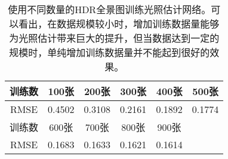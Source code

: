 \begin{table}[htbp]
    \centering
    \caption[数据规模对光照估计的影响]{
        \label{table:eval-data-size}
        使用不同数量的HDR全景图训练光照估计网络。可以看出，在数据规模较小时，增加训练数据量能够为光照估计带来巨大的提升，但当数据达到一定的规模时，单纯增加训练数据量并不能起到很好的效果。
    }
    \begin{tabular}{c|c|c|c|c|c}
        \toprule
        训练数  &  100张&  200张&  300张&  400张&  500张 \\ \hline
        RMSE &  0.4502& 0.3108& 0.2161& 0.1892&0.1774 \\
        \midrule
        训练数  &  600张&  700张&  800张&  900张&  ~ \\ \hline
        RMSE &  0.1683&0.1633&0.1621&0.1614 & ~ \\
        \bottomrule
    \end{tabular}
\end{table}